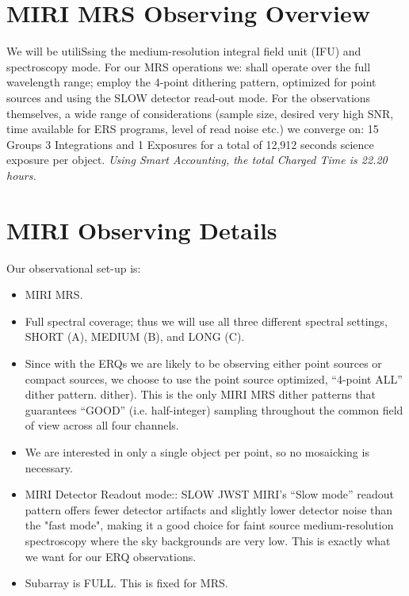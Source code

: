 \section*{MIRI MRS Observing Overview}
We will be utiliSsing the medium-resolution integral field unit (IFU) and spectroscopy mode.  
For our MRS operations we: shall operate over the full wavelength range; 
employ the 4-point dithering pattern, optimized for point sources and using the SLOW  detector read-out mode. For the observations themselves, a wide range of considerations (sample size, desired very high SNR, time available for ERS programs, level of read noise etc.) we converge on:
15 Groups
3 Integrations and 
1 Exposures for a total 
of 12,912 seconds science exposure per object.
{\it Using Smart Accounting, the total Charged Time is 22.20 hours.}


\section*{MIRI Observing Details}
Our observational set-up is:
\begin{itemize}
    \item MIRI MRS.  

    \item Full spectral coverage; thus we will use all three different spectral settings, SHORT (A), MEDIUM (B), and LONG (C).  

    \item Since with the ERQs we are likely to be observing
      either point sources or compact sources, we choose to use the point
      source optimized, ``4-point ALL'' dither pattern.
      dither). This is
      the only MIRI MRS dither patterns that guarantees ``GOOD''
      (i.e. half-integer) sampling throughout the common field of view
      across all four channels.

    \item We are interested in only a single object per point, so no mosaicking is necessary.  

    \item{MIRI Detector Readout mode:: SLOW 
        JWST MIRI's ``Slow mode'' readout pattern offers fewer detector
        artifacts and slightly lower detector noise than the "fast mode",
        making it a good choice for faint source medium-resolution
        spectroscopy where the sky backgrounds are very low. This is 
        exactly what we want for our ERQ observations.}

    \item{Subarray is FULL. This is fixed for MRS.}
\end{itemize}

